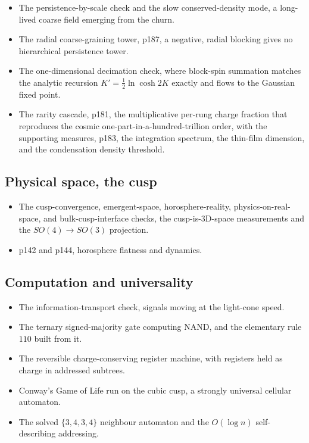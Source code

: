 \begin{itemize}
  \item The persistence-by-scale check and the slow conserved-density mode, a long-lived coarse field emerging
  from the churn.
  \item The radial coarse-graining tower, p187, a negative, radial blocking gives no hierarchical persistence
  tower.
  \item The one-dimensional decimation check, where block-spin summation matches the analytic recursion
  $K' = \tfrac{1}{2}\ln\cosh 2K$ exactly and flows to the Gaussian fixed point.
  \item The rarity cascade, p181, the multiplicative per-rung charge fraction that reproduces the cosmic
  one-part-in-a-hundred-trillion order, with the supporting measures, p183, the integration spectrum, the
  thin-film dimension, and the condensation density threshold.
\end{itemize}

\subsection{Physical space, the cusp}

\begin{itemize}
  \item The cusp-convergence, emergent-space, horosphere-reality, physics-on-real-space, and bulk-cusp-interface
  checks, the cusp-is-3D-space measurements and the $SO(4) \to SO(3)$ projection.
  \item p142 and p144, horosphere flatness and dynamics.
\end{itemize}

\subsection{Computation and universality}

\begin{itemize}
  \item The information-transport check, signals moving at the light-cone speed.
  \item The ternary signed-majority gate computing NAND, and the elementary rule $110$ built from it.
  \item The reversible charge-conserving register machine, with registers held as charge in addressed
  subtrees.
  \item Conway's Game of Life run on the cubic cusp, a strongly universal cellular automaton.
  \item The solved $\{3,4,3,4\}$ neighbour automaton and the $O(\log n)$ self-describing addressing.
\end{itemize}

